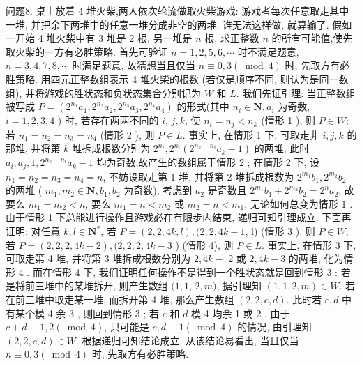 问题8. 桌上放着 4 堆火柴,两人依次轮流做取火柴游戏: 游戏者每次任意取走其中一堆, 并把余下两堆中的任意一堆分成非空的两堆.
谁无法这样做, 就算输了.
假如一开始 4 堆火柴中有 3 堆是 2 根, 另一堆是 $n$ 根, 求正整数 $n$ 的所有可能值,使先取火柴的一方有必胜策略.
首先可验证 $n=1,2,5,6, \cdots$ 时不满足题意, $n=3,4,7,8, \cdots$ 时满足题意, 故猜想当且仅当 $n \equiv 0,3(\bmod 4)$ 时, 先取方有必胜策略.
用四元正整数组表示 4 堆火柴的根数 (若仅是顺序不同, 则认为是同一数组), 并将游戏的胜状态和负状态集合分别记为 $W$ 和 $L$.
我们先证引理: 当正整数组被写成 $P=\left(2^{n_1} a_1, 2^{n_2} a_2, 2^{n_3} a_3, 2^{n_4} a_4\right)$
的形式(其中 $n_i \in \mathbf{N}, a_i$ 为奇数, $i=1,2,3,4$ ) 时, 若存在两两不同的 $i$, $j, k$, 使 $n_i=n_j<n_k$ (情形 1 ), 则 $P \in W$; 若 $n_1=n_2=n_3=n_4$ (情形 2 ), 则 $P \in L$.
事实上, 在情形 1 下, 可取走非 $i, j, k$ 的那堆, 并将第 $k$ 堆拆成根数分别为 $2^{n_i}, 2^{n_i}\left(2^{n_k-n_i} a_k-1\right)$ 的两堆, 此时 $a_i, a_j, 1,2^{n_k-n_i} a_k-1$ 均为奇数,故产生的数组属于情形 2 ; 在情形 2 下, 设 $n_1=n_2=n_3=n_4=n$, 不妨设取走第 1 堆, 并将第 2 堆拆成根数为 $2^{m_1} b_1, 2^{m_2} b_2$ 的两堆 ( $m_1, m_2 \in \mathbf{N}, b_1, b_2$ 为奇数), 考虑到 $a_2$ 是奇数且 $2^{m_1} b_1+2^{m_2} b_2=2^n a_2$, 故要么 $m_1=m_2<n$, 要么 $m_1=n< m_2$ 或 $m_2=n<m_1$, 无论如何总变为情形 1 .
由于情形 1 下总能进行操作且游戏必在有限步内结束, 递归可知引理成立.
下面再证明: 对任意 $k, l \in \mathbf{N}^*$, 若 $P=(2,2,4 k, l),(2,2,4 k-1$, l) (情形 3 ), 则 $P \in W$; 若 $P=(2,2,2,4 k-2),(2,2,2,4 k-3$ ) (情形 4), 则 $P \in L$.
事实上, 在情形 3 下, 可取走第 4 堆, 并将第 3 堆拆成根数分别为 $2,4 k-$ 2 或 $2,4 k-3$ 的两堆, 化为情形 4 . 而在情形 4 下, 我们证明任何操作不是得到一个胜状态就是回到情形 3 : 若是将前三堆中的某堆拆开, 则产生数组 $(1,1$, $2, m)$, 据引理知 $(1,1,2, m) \in W$. 若在前三堆中取走某一堆, 而拆开第 4 堆, 那么产生数组 $(2,2, c, d)$. 此时若 $c, d$ 中有某个模 4 余 3 , 则回到情形 3 ; 若 $c$ 和 $d$ 模 4 均余 1 或 2 , 由于 $c+d \equiv 1,2(\bmod 4)$, 只可能是 $c, d \equiv 1(\bmod 4)$ 的情况, 由引理知 $(2,2, c, d) \in W$.
根据递归可知结论成立.
从该结论易看出, 当且仅当 $n \equiv 0,3(\bmod 4)$ 时, 先取方有必胜策略.


